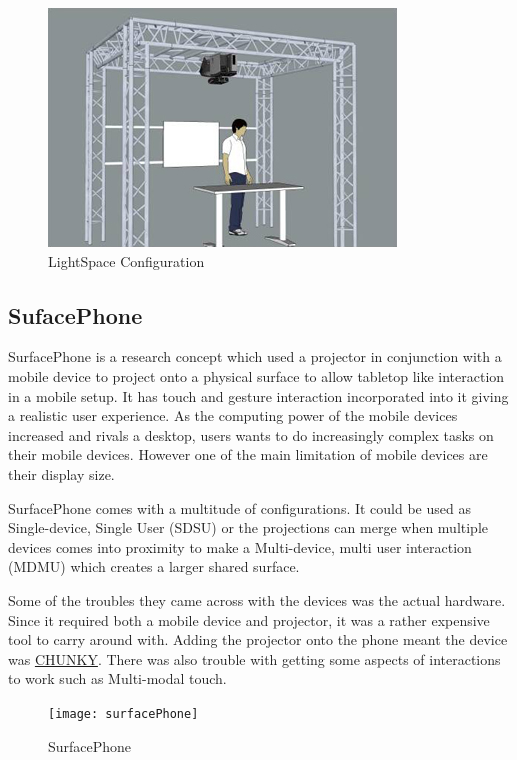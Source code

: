 \begin{figure}[H]
\includegraphics{images/LightSpace_configuration}

\protect\caption{LightSpace Configuration}
\end{figure}




\subsection{SufacePhone}

SurfacePhone\cite{surfacephone} is a research concept which used
a projector in conjunction with a mobile device to project onto a
physical surface to allow tabletop like interaction in a mobile setup.
It has touch and gesture interaction incorporated into it giving a
realistic user experience. As the computing power of the mobile devices
increased and rivals a desktop, users wants to do increasingly complex
tasks on their mobile devices. However one of the main limitation
of mobile devices are their display size. 

SurfacePhone comes with a multitude of configurations. It could be
used as Single-device, Single User (SDSU) or the projections can merge
when multiple devices comes into proximity to make a Multi-device,
multi user interaction (MDMU) which creates a larger shared surface. 

Some of the troubles they came across with the devices was the actual
hardware. Since it required both a mobile device and projector, it
was a rather expensive tool to carry around with. Adding the projector
onto the phone meant the device was \uline{CHUNKY}. There was also
trouble with getting some aspects of interactions to work such as
Multi-modal touch.
\begin{figure}[H]
\texttt{[image: surfacePhone]}

\protect\caption{SurfacePhone}


\end{figure}

